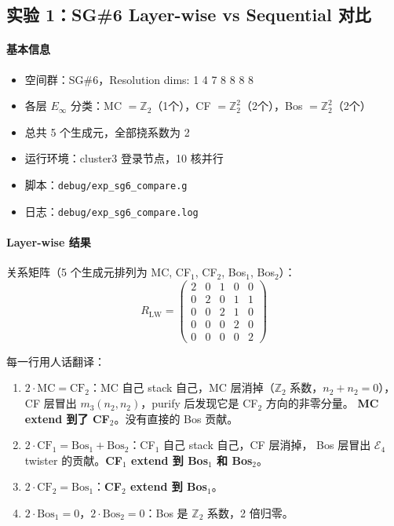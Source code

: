 \documentclass[a4paper,fontset=ubuntu,12pt]{ctexart}
\begin{document}
\subsection{实验 1：SG\#6 Layer-wise vs Sequential 对比}
\label{sec:exp1-sg6}

\paragraph{基本信息}
\begin{itemize}
\item 空间群：SG\#6，Resolution dims: 1 4 7 8 8 8 8
\item 各层 $E_\infty$ 分类：MC $=\mathbb{Z}_2$（1个），CF $=\mathbb{Z}_2^2$（2个），Bos $=\mathbb{Z}_2^2$（2个）
\item 总共 5 个生成元，全部挠系数为 2
\item 运行环境：cluster3 登录节点，10 核并行
\item 脚本：\texttt{debug/exp\_sg6\_compare.g}
\item 日志：\texttt{debug/exp\_sg6\_compare.log}
\end{itemize}

\paragraph{Layer-wise 结果}

关系矩阵（5 个生成元排列为 MC, CF$_1$, CF$_2$, Bos$_1$, Bos$_2$）：
\begin{equation}
R_{\mathrm{LW}} = \begin{pmatrix}
2 & 0 & 1 & 0 & 0 \\
0 & 2 & 0 & 1 & 1 \\
0 & 0 & 2 & 1 & 0 \\
0 & 0 & 0 & 2 & 0 \\
0 & 0 & 0 & 0 & 2
\end{pmatrix}
\label{eq:rmat-lw-sg6}
\end{equation}

每一行用人话翻译：
\begin{enumerate}
\item $2\cdot\mathrm{MC} = \mathrm{CF}_2$：MC 自己 stack 自己，MC 层消掉（$\mathbb{Z}_2$ 系数，$n_2+n_2=0$），
  CF 层冒出 $m_3(n_2,n_2)$，purify 后发现它是 CF$_2$ 方向的非零分量。
  \textbf{MC extend 到了 CF$_2$}。没有直接的 Bos 贡献。
\item $2\cdot\mathrm{CF}_1 = \mathrm{Bos}_1 + \mathrm{Bos}_2$：CF$_1$ 自己 stack 自己，CF 层消掉，
  Bos 层冒出 $\mathcal{E}_4$ twister 的贡献。\textbf{CF$_1$ extend 到 Bos$_1$ 和 Bos$_2$}。
\item $2\cdot\mathrm{CF}_2 = \mathrm{Bos}_1$：\textbf{CF$_2$ extend 到 Bos$_1$}。
\item $2\cdot\mathrm{Bos}_1 = 0$，$2\cdot\mathrm{Bos}_2 = 0$：Bos 是 $\mathbb{Z}_2$ 系数，2 倍归零。
\end{enumerate}
\end{document}
